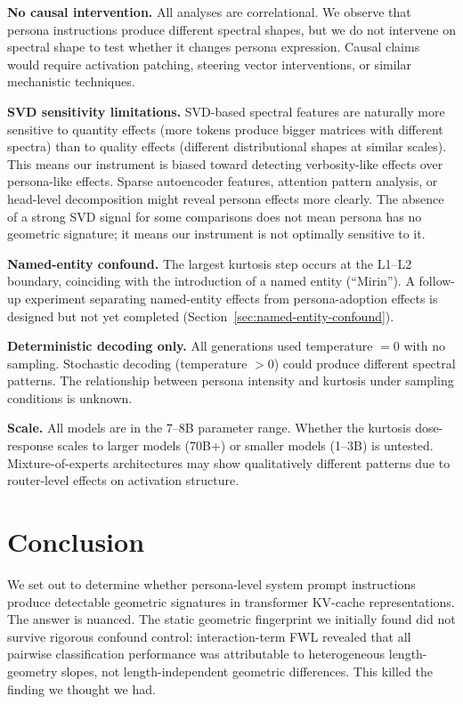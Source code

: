\documentclass[11pt]{article}
\begin{document}
\textbf{No causal intervention.} All analyses are correlational. We observe that persona instructions produce different spectral shapes, but we do not intervene on spectral shape to test whether it changes persona expression. Causal claims would require activation patching, steering vector interventions, or similar mechanistic techniques.

\textbf{SVD sensitivity limitations.} SVD-based spectral features are naturally more sensitive to quantity effects (more tokens produce bigger matrices with different spectra) than to quality effects (different distributional shapes at similar scales). This means our instrument is biased toward detecting verbosity-like effects over persona-like effects. Sparse autoencoder features, attention pattern analysis, or head-level decomposition might reveal persona effects more clearly. The absence of a strong SVD signal for some comparisons does not mean persona has no geometric signature; it means our instrument is not optimally sensitive to it.

\textbf{Named-entity confound.} The largest kurtosis step occurs at the L1--L2 boundary, coinciding with the introduction of a named entity (``Mirin''). A follow-up experiment separating named-entity effects from persona-adoption effects is designed but not yet completed (Section~\ref{sec:named-entity-confound}).

\textbf{Deterministic decoding only.} All generations used temperature $= 0$ with no sampling. Stochastic decoding (temperature $> 0$) could produce different spectral patterns. The relationship between persona intensity and kurtosis under sampling conditions is unknown.

\textbf{Scale.} All models are in the 7--8B parameter range. Whether the kurtosis dose-response scales to larger models (70B+) or smaller models (1--3B) is untested. Mixture-of-experts architectures may show qualitatively different patterns due to router-level effects on activation structure.

\section{Conclusion}
\label{sec:conclusion}

We set out to determine whether persona-level system prompt instructions produce detectable geometric signatures in transformer KV-cache representations. The answer is nuanced. The static geometric fingerprint we initially found did not survive rigorous confound control: interaction-term FWL revealed that all pairwise classification performance was attributable to heterogeneous length-geometry slopes, not length-independent geometric differences. This killed the finding we thought we had.
\end{document}
